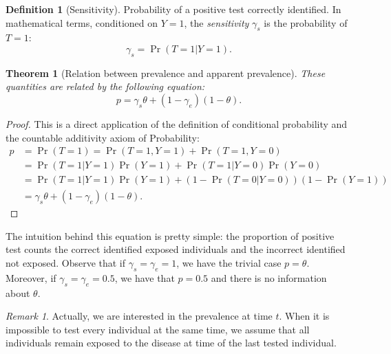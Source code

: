 \documentclass[a4paper, notitlepage, 11pt]{article}
\newtheorem{theorem}{Theorem}[]
\theoremstyle{definition}
\newtheorem{definition}{Definition}[section]
\theoremstyle{remark}
\newtheorem*{remark}{Remark}
\begin{document}
\begin{definition}[Sensitivity]
  Probability of a positive test correctly identified. In mathematical terms,
  conditioned on $Y = 1$, the {\em sensitivity} $\gamma_s$ is the probability of $T = 1$: 
  \begin{equation}
    \gamma_s = \Pr(T = 1|Y = 1). 
  \end{equation} 
\end{definition}

\begin{theorem}[Relation between prevalence and apparent prevalence] These quantities are related by the following equation:
  \begin{equation}
    p = \gamma_s\theta + (1-\gamma_e)(1-\theta).
  \end{equation}
  
\end{theorem}

\begin{proof}
  This is a direct application of the definition of conditional probability
  and the countable additivity axiom of Probability:
  \begin{equation*}
    \begin{split}
      p &= \Pr(T = 1) = \Pr(T = 1, Y = 1) + \Pr(T = 1, Y = 0) \\
      &= \Pr(T=1|Y=1)\Pr(Y=1) + \Pr(T=1|Y=0)\Pr(Y=0) \\
      &= \Pr(T=1|Y=1)\Pr(Y=1) + (1 - \Pr(T=0|Y=0))(1-\Pr(Y=1)) \\
      &= \gamma_s\theta + (1 - \gamma_e)(1-\theta).
    \end{split}
  \end{equation*} 
\end{proof}

The intuition behind this equation is pretty simple: the proportion
of positive test counts the correct identified exposed individuals and the
incorrect identified not exposed. Observe that if $\gamma_s = \gamma_e = 1$, we have the trivial case $p =
\theta$. Moreover, if $\gamma_s = \gamma_e = 0.5$, we have that
$p = 0.5$ and there is no information about $\theta$. 

\begin{remark}
  Actually, we are interested in the prevalence at time $t$. When it is 
  impossible to test every individual at the same time, we assume that all
  individuals remain exposed to the disease at time of the last tested individual. 
\end{remark}
\end{document}
